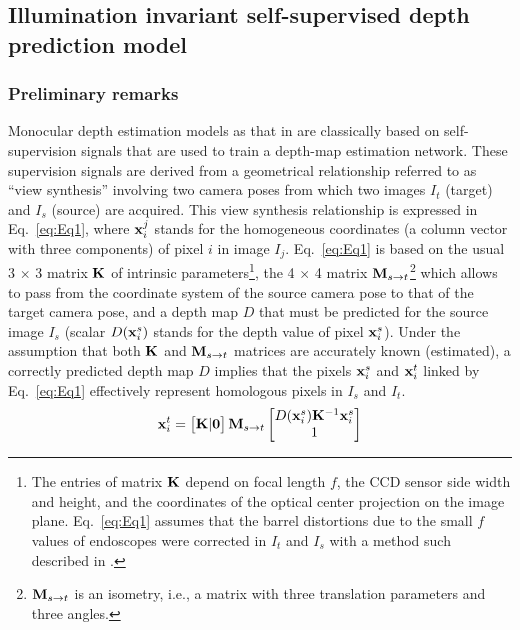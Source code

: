 \documentclass[a4paper,fleqn]{cas-dc}
\begin{document}
\subsection{Illumination invariant self-supervised depth prediction model}
%
\subsubsection{Preliminary remarks} \label{sec:preleminaryRemarks}
%
Monocular depth estimation models as that in \citep{Godard_ICCV_2019,Zhou_CVPR_2017,Zhou_ICCV_2019,Zhao_3DV_2022}
are classically based on self-supervision signals that are used to train a depth-map estimation network. 
%
These supervision signals are derived from a geometrical relationship referred to as ``view synthesis'' involving two camera poses from which two images $I_t$ (target) and $I_s$ (source) are acquired. This view synthesis relationship is expressed in Eq.~\eqref{eq:Eq1}, where ${\bf x}^j_i$ stands for the homogeneous coordinates (a column vector with three components) of pixel $i$ in image $I_j$. Eq.~\eqref{eq:Eq1} is based on the usual 3 $\times$ 3 matrix $\bf{K}$ of intrinsic 
parameters\footnote{The entries of matrix $\bf{K}$ depend on focal length $f$, the CCD sensor side width and height, and the coordinates of the optical center projection on the image plane. Eq.~\eqref{eq:Eq1} assumes that the barrel distortions due to the small $f$ values of endoscopes were corrected in $I_t$ and $I_s$ with a method such described in \citep{Miranda_ICIP_2004}.},  
%
the 4 $\times$ 4 matrix ${\bf M}_{s \rightarrow t}$\footnote{${\bf M}_{s \rightarrow t}$ is an isometry, i.e., a matrix with three translation parameters and three angles.}
%
which allows to pass from the coordinate system of the source camera pose to that of the target camera pose, and a depth map $D$ that must be predicted for the source image $I_s$ (scalar $D({\bf x}^s_i)$ stands for the depth value of pixel ${\bf x}^s_i$). 
%
 Under the assumption that both  $\bf{K}$ and ${\bf M}_{s \rightarrow t}$ matrices are accurately known (estimated), a correctly predicted depth map $D$ implies that the pixels ${\bf x}^s_{i}$ and ${\bf x}^t_{i}$ linked by Eq.~\eqref{eq:Eq1} effectively represent homologous pixels in $I_s$ and $I_t$.      
%
\begin{equation} \label{eq:Eq1}
{\bf x}_i^t = 
\begin{bmatrix}
\mathbf{K} | \mathbf{0}
\end{bmatrix}
\mathbf{M}_{s\rightarrow t}
\begin{bmatrix}
D({\bf x}^s_i) \mathbf{K}^{-1} {\bf x}_i^s\\
 1
\end{bmatrix}
\end{equation}
\end{document}
